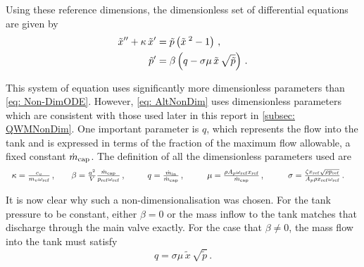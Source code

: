 Using these reference dimensions, the dimensionless set of differential equations are given by
~
\begin{equation} \label{eq: AltNonDim}
\begin{split}
    \tilde{x}{''} + \kappa \, \tilde{x}{'} &=  \tilde{p} \left( \tilde{x}^{\;2}  - 1 \right) \, , \\
    \tilde{p}{'} &= \beta \left( q - \sigma \mu \, \tilde{x} \, \sqrt{\tilde{p}} \right) \, .
\end{split}
\end{equation}

This system of equation uses significantly more dimensionless parameters than \cref{eq: Non-DimODE}. However, \cref{eq: AltNonDim} uses dimensionless parameters which are consistent with those used later in this report in \cref{subsec: QWMNonDim}. One important parameter is $q$, which represents the flow into the tank and is expressed in terms of the fraction of the maximum flow allowable, a fixed constant $\dot{m}_{\rm{cap}}$. The definition of all the dimensionless parameters used are
~
\begin{equation*}
    \begin{tabular}{p{2.1cm} p{2.8cm} p{2.1cm} p{3cm} p{2.8cm}}
        $ \kappa = \frac{c_v}{m_v \omega_{\rm{ref}}} \, , $
        &
        $ \beta = \frac{a^2}{V} \frac{\dot{m}_{\rm{cap}}}{p_{\rm{ref}} \omega_{\rm{ref}}} \, , $
        &
        $ q = \frac{\dot{m}_{\rm{in}}}{\dot{m}_{\rm{cap}}} \, , $
        &
        $ \mu = \frac{\rho A_p \omega_{\rm{ref}} x_{\rm{ref}}}{\dot{m}_{\rm{cap}}} \, , $
        &
        $ \sigma = \frac{\zeta x_{\rm{ref}} \sqrt{\rho p_{\rm{ref}}}}{A_p \rho x_{\rm{ref}} \omega_{\rm{ref}}} \, . $
    \end{tabular}
\end{equation*}

It is now clear why such a non-dimensionalisation was chosen. For the tank pressure to be constant, either $\beta = 0$ or the mass inflow to the tank matches that discharge through the main valve exactly. For the case that $\beta \neq 0$, the mass flow into the tank must satisfy
~
\begin{equation*}
    q = \sigma \mu \, \tilde{x} \, \sqrt{\tilde{p}} \, .
\end{equation*}

